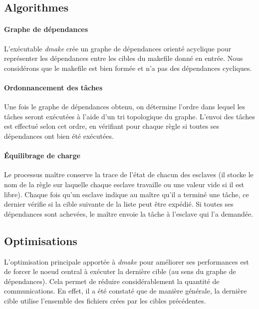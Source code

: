 \documentclass[a4paper,12pt,twoside]{article}
\begin{document}
\subsection{Algorithmes}

\paragraph{Graphe de dépendances}

L'exécutable \emph{dmake} crée un graphe de dépendances orienté
acyclique pour représenter les dépendances entre les cibles du
makefile donné en entrée. Nous considérons que le makefile est bien
formée et n'a pas des dépendances cycliques.

\paragraph{Ordonnancement des tâches}

Une fois le graphe de dépendances obtenu, on détermine l'ordre dans lequel
les tâches seront exécutées à l'aide d'un tri
topologique du graphe. L'envoi des tâches est effectué selon cet
ordre, en vérifiant pour chaque règle si toutes ses dépendances ont
bien été exécutées. 

\paragraph{Équilibrage de charge}

Le processus maître conserve la trace de l'état de chacun des esclaves
(il stocke le nom de la règle sur laquelle chaque esclave travaille ou
une valeur vide si il est libre). Chaque fois qu'un esclave indique
au maître qu'il a terminé une tâche, ce dernier vérifie si la cible
suivante de la liste peut être expédié. Si toutes ses dépendances sont
achevées, le maître envoie la tâche à l'esclave qui l'a demandée.  

\subsection{Optimisations}

L'optimisation principale apportée à  \emph{dmake} pour améliorer ses performances
est de forcer le noeud central à exécuter la dernière cible (au sens du graphe de dépendances).
Cela permet de réduire considérablement la quantité de communications.
En effet, il a été constaté que de manière générale, la
dernière cible utilise l'ensemble
des fichiers crées par les cibles précédentes.
\end{document}
